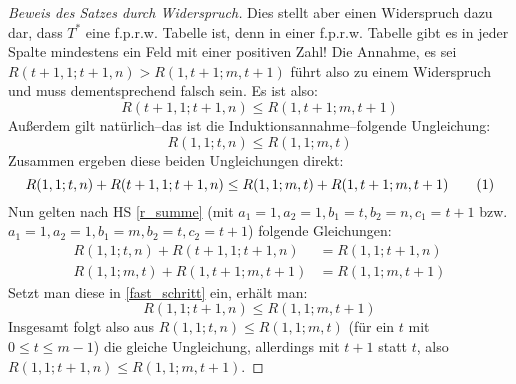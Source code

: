 \begin{proof}[Beweis des Satzes durch Widerspruch]
    Dies stellt aber einen Widerspruch dazu dar, dass $T^*$ eine f.p.r.w. Tabelle ist, denn in einer f.p.r.w. Tabelle 
    gibt es in jeder Spalte mindestens ein Feld mit einer positiven Zahl! Die Annahme, es sei $R(t+1, 1; t+1, n)>
    R(1, t+1; m, t+1)$ führt also zu einem Widerspruch und muss dementsprechend falsch sein. Es ist also:
    \[
        R(t+1, 1; t+1, n)\leq R(1, t+1; m, t+1)
    \]
    Außerdem gilt natürlich--das ist die Induktionsannahme--folgende Ungleichung:
    \[
        R(1, 1; t, n)\leq R(1, 1; m, t)
    \]
    Zusammen ergeben diese beiden Ungleichungen direkt:
    \[
        R(1, 1; t, n)+R(t+1, 1; t+1, n)\leq R(1, 1; m, t)+R(1, t+1; m, t+1) \numberthis \label{fast_schritt}
    \]
    Nun gelten nach HS \ref{r_summe} (mit $a_1=1, a_2=1, b_1=t, b_2=n, c_1=t+1$ bzw. $a_1=1, a_2=1, b_1=m, b_2=t, 
    c_2=t+1$) folgende Gleichungen:
    \begin{align*}
        R(1, 1; t, n)+R(t+1, 1; t+1, n)&=R(1, 1; t+1, n)\\
        R(1, 1; m, t)+R(1, t+1; m, t+1)&=R(1, 1; m, t+1)
    \end{align*}
    Setzt man diese in \eqref{fast_schritt} ein, erhält man:
    \[
        R(1, 1; t+1, n)\leq R(1, 1; m, t+1)
    \]
    Insgesamt folgt also aus $R(1, 1; t, n)\leq R(1, 1; m, t)$ (für ein $t$ mit $0\leq t\leq m-1$) die gleiche 
    Ungleichung, allerdings mit $t+1$ statt $t$, also $R(1, 1; t+1, n)\leq R(1, 1; m, t+1)$.


\end{proof}
